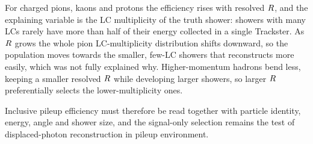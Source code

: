 For charged pions, kaons and protons the efficiency rises with
resolved $R$, and the explaining variable
is the LC multiplicity of the truth shower: showers with many LCs rarely have
more than half of their energy collected in a single Trackster. As $R$ grows
the whole pion LC-multiplicity distribution shifts downward, so the population
moves towards the smaller, few-LC showers that \cluethreed{} reconstructs more
easily, which was not fully explained why. Higher-momentum hadrons bend less, keeping a smaller resolved $R$
while developing larger showers, so larger $R$ preferentially selects the
lower-multiplicity ones.

Inclusive pileup efficiency must therefore be read together with particle
identity, energy, angle and shower size, and the signal-only selection remains
the test of displaced-photon reconstruction in pileup environment.
